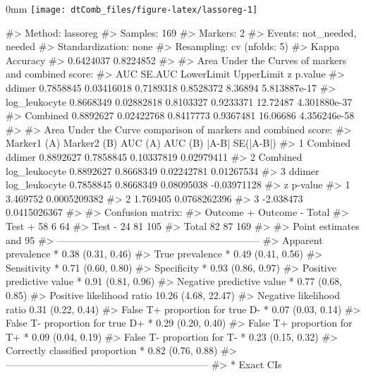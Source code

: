 \documentclass[]{article}
\renewenvironment{verbatim}{\color{codecolor}\begin{myshaded}\begin{oldverbatim}}{\end{oldverbatim}\end{myshaded}}
\begin{document}
\begin{adjustwidth}{\fltoffset}{0mm}
\texttt{[image: dtComb\_files/figure-latex/lassoreg-1]} \end{adjustwidth}

\begin{verbatim}
#> Method: lassoreg 
#> Samples: 169 
#> Markers: 2 
#> Events: not_needed, needed 
#> Standardization: none 
#> Resampling: cv (nfolds: 5)
#>  Kappa       Accuracy  
#>  0.6424037   0.8224852
#> 
#> Area Under the Curves of markers and combined score:  
#>                     AUC     SE.AUC LowerLimit UpperLimit        z      p.value
#> ddimer        0.7858845 0.03416018  0.7189318  0.8528372  8.36894 5.813887e-17
#> log_leukocyte 0.8668349 0.02882818  0.8103327  0.9233371 12.72487 4.301880e-37
#> Combined      0.8892627 0.02422768  0.8417773  0.9367481 16.06686 4.356246e-58
#> 
#> Area Under the Curve comparison of markers and combined score:  
#>   Marker1 (A)   Marker2 (B)   AUC (A)   AUC (B)      |A-B|   SE(|A-B|)
#> 1    Combined        ddimer 0.8892627 0.7858845 0.10337819  0.02979411
#> 2    Combined log_leukocyte 0.8892627 0.8668349 0.02242781  0.01267534
#> 3      ddimer log_leukocyte 0.7858845 0.8668349 0.08095038 -0.03971128
#>           z      p-value
#> 1  3.469752 0.0005209382
#> 2  1.769405 0.0768262396
#> 3 -2.038473 0.0415026367
#> 
#> Confusion matrix:  
#>           Outcome +    Outcome -      Total
#> Test +           58            6         64
#> Test -           24           81        105
#> Total            82           87        169
#> 
#> Point estimates and 95% CIs:
#> --------------------------------------------------------------
#> Apparent prevalence *                  0.38 (0.31, 0.46)
#> True prevalence *                      0.49 (0.41, 0.56)
#> Sensitivity *                          0.71 (0.60, 0.80)
#> Specificity *                          0.93 (0.86, 0.97)
#> Positive predictive value *            0.91 (0.81, 0.96)
#> Negative predictive value *            0.77 (0.68, 0.85)
#> Positive likelihood ratio              10.26 (4.68, 22.47)
#> Negative likelihood ratio              0.31 (0.22, 0.44)
#> False T+ proportion for true D- *      0.07 (0.03, 0.14)
#> False T- proportion for true D+ *      0.29 (0.20, 0.40)
#> False T+ proportion for T+ *           0.09 (0.04, 0.19)
#> False T- proportion for T- *           0.23 (0.15, 0.32)
#> Correctly classified proportion *      0.82 (0.76, 0.88)
#> --------------------------------------------------------------
#> * Exact CIs
\end{verbatim}
\end{document}

